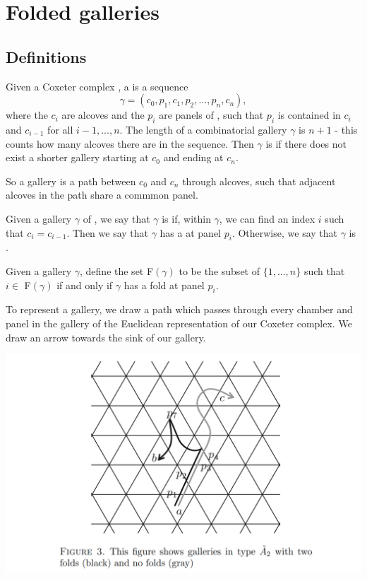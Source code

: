 \documentclass[11pt]{article}
\begin{document}
\section{Folded galleries}

\subsection{Definitions}
\begin{definition}
    Given a Coxeter complex \sg, a  is a sequence
    \[\gamma = (c_0,p_1,c_1,p_2,...,p_n,c_n),\]
    where the $c_i$ are alcoves and the $p_i$ are panels of \sg, such that $p_i$ is contained in $c_i$ and $c_{i-1}$ for all $i-1,...,n$. The length of a combinatorial gallery $\gamma$ is $n+1$ - this counts how many alcoves there are in the sequence. Then $\gamma$ is  if there does not exist a shorter gallery starting at $c_0$ and ending at $c_n$. 
\end{definition}

So a gallery is a path between $c_0$ and $c_n$ through alcoves, such that adjacent alcoves in the path share a commmon panel. 

\begin{definition}
    Given a gallery $\gamma$ of \sg, we say that $\gamma$ is  if, within $\gamma$, we can find an index $i$ such that $c_i=c_{i-1}$. Then we say that $\gamma$ has a  at panel $p_i$. Otherwise, we say that $\gamma$ is .  
\end{definition}

\begin{definition}
    Given a gallery $\gamma$, define the set F$(\gamma)$ to be the subset of $\{1,...,n\}$ such that $i\in$ F$(\gamma)$ if and only if $\gamma$ has a fold at panel $p_i$. 
\end{definition}

To represent a gallery, we draw a path which passes through every chamber and panel in the gallery of the Euclidean representation of our Coxeter complex. We draw an arrow towards the sink of our gallery. 

\includegraphics[scale=0.6]{Screenshot 2023-02-03 111653.png}\\
\end{document}
